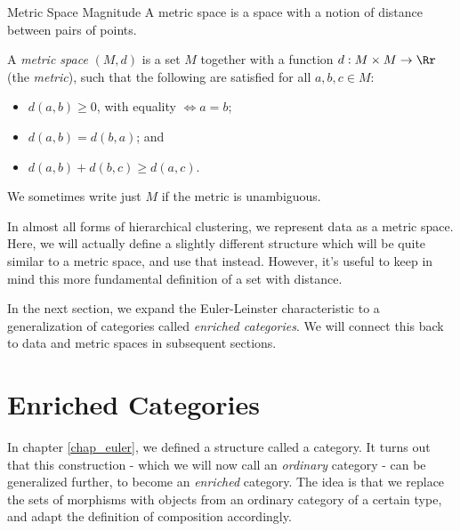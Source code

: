 \documentclass[12pt]{pom_thesis}
\begin{document}
\begin{chapter}{Metric Space Magnitude}
A metric space is a space with a notion of distance between pairs of points. 
\begin{defn}
A \textit{metric space} $(M,d)$ is a set $M$ together with a function  $d:M \times M \rightarrow \Rr$ (the \emph{metric}), such that the following are satisfied for all $a,b,c \in M$:
\begin{itemize}
\item $d(a,b) \geq 0$, with equality $\iff a = b$;
\item $d(a,b) = d(b,a)$; and
\item $d(a,b) + d(b,c) \geq d(a,c)$.
\end{itemize}
We sometimes write just $M$ if the metric is unambiguous.
\end{defn}

In almost all forms of hierarchical clustering, we represent data as a metric space. Here, we will actually define a slightly different structure which will be quite similar to a metric space, and use that instead. However, it's useful to keep in mind this more fundamental definition of a set with distance.

In the next section, we expand the Euler-Leinster characteristic to a generalization of categories called \emph{enriched categories}. We will connect this back to data and metric spaces in subsequent sections.
\section{Enriched Categories}
In chapter \ref{chap_euler}, we defined a structure called a category. It turns out that this construction - which we will now call an \emph{ordinary} category - can be generalized further, to become an \emph{enriched} category. The idea is that we replace the sets of morphisms with objects from an ordinary category of a certain type, and adapt the definition of composition accordingly. 



\end{chapter}
\end{document}
